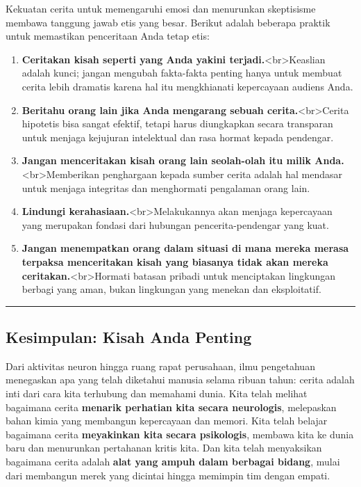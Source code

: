 \documentclass[
  letterpaper,
  DIV=11,
  numbers=noendperiod]{scrreprt}
\begin{document}
Kekuatan cerita untuk memengaruhi emosi dan menurunkan skeptisisme
membawa tanggung jawab etis yang besar. Berikut adalah beberapa praktik
untuk memastikan penceritaan Anda tetap etis:

\begin{enumerate}
\def\labelenumi{\arabic{enumi}.}
\item
  \textbf{Ceritakan kisah seperti yang Anda yakini
  terjadi.}\textless br\textgreater Keaslian adalah kunci; jangan
  mengubah fakta-fakta penting hanya untuk membuat cerita lebih dramatis
  karena hal itu mengkhianati kepercayaan audiens Anda.
\item
  \textbf{Beritahu orang lain jika Anda mengarang sebuah
  cerita.}\textless br\textgreater Cerita hipotetis bisa sangat efektif,
  tetapi harus diungkapkan secara transparan untuk menjaga kejujuran
  intelektual dan rasa hormat kepada pendengar.
\item
  \textbf{Jangan menceritakan kisah orang lain seolah-olah itu milik
  Anda.}\textless br\textgreater Memberikan penghargaan kepada sumber
  cerita adalah hal mendasar untuk menjaga integritas dan menghormati
  pengalaman orang lain.
\item
  \textbf{Lindungi kerahasiaan.}\textless br\textgreater Melakukannya
  akan menjaga kepercayaan yang merupakan fondasi dari hubungan
  pencerita-pendengar yang kuat.
\item
  \textbf{Jangan menempatkan orang dalam situasi di mana mereka merasa
  terpaksa menceritakan kisah yang biasanya tidak akan mereka
  ceritakan.}\textless br\textgreater Hormati batasan pribadi untuk
  menciptakan lingkungan berbagi yang aman, bukan lingkungan yang
  menekan dan eksploitatif.
\end{enumerate}

\begin{center}\rule{0.5\linewidth}{0.5pt}\end{center}

\subsection{Kesimpulan: Kisah Anda
Penting}\label{kesimpulan-kisah-anda-penting}

Dari aktivitas neuron hingga ruang rapat perusahaan, ilmu pengetahuan
menegaskan apa yang telah diketahui manusia selama ribuan tahun: cerita
adalah inti dari cara kita terhubung dan memahami dunia. Kita telah
melihat bagaimana cerita \textbf{menarik perhatian kita secara
neurologis}, melepaskan bahan kimia yang membangun kepercayaan dan
memori. Kita telah belajar bagaimana cerita \textbf{meyakinkan kita
secara psikologis}, membawa kita ke dunia baru dan menurunkan pertahanan
kritis kita. Dan kita telah menyaksikan bagaimana cerita adalah
\textbf{alat yang ampuh dalam berbagai bidang}, mulai dari membangun
merek yang dicintai hingga memimpin tim dengan empati.
\end{document}
